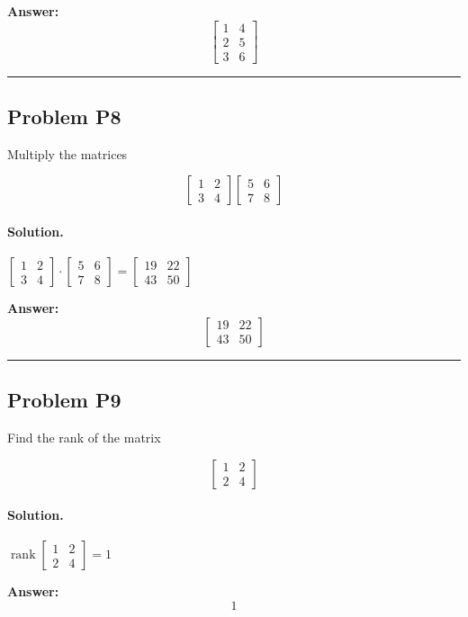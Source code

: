 \documentclass[12pt, a4paper]{article}
\newcommand{\problem}[1]{\subsection*{Problem #1}}
\newcommand{\solution}{\paragraph{Solution.}}
\begin{document}
\textbf{Answer:}
\[\boxed{\left[\begin{matrix}1 & 4\\2 & 5\\3 & 6\end{matrix}\right]}\]

\vspace{1em}
\hrule
\vspace{1em}

\problem{P8}

Multiply the matrices

$$\begin{bmatrix}1 & 2\\3 & 4\end{bmatrix}\begin{bmatrix}5 & 6\\7 & 8\end{bmatrix}$$

\solution

$\left[\begin{matrix}1 & 2\\3 & 4\end{matrix}\right] \cdot \left[\begin{matrix}5 & 6\\7 & 8\end{matrix}\right] = \left[\begin{matrix}19 & 22\\43 & 50\end{matrix}\right]$

\textbf{Answer:}
\[\boxed{\left[\begin{matrix}19 & 22\\43 & 50\end{matrix}\right]}\]

\vspace{1em}
\hrule
\vspace{1em}

\problem{P9}

Find the rank of the matrix

$$\begin{bmatrix}1 & 2\\2 & 4\end{bmatrix}$$

\solution

$\operatorname{rank}\left[\begin{matrix}1 & 2\\2 & 4\end{matrix}\right] = 1$

\textbf{Answer:}
\[\boxed{1}\]
\end{document}
